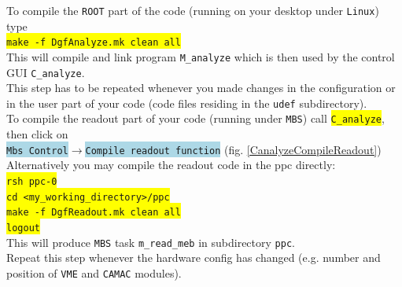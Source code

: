 \documentclass[10pt]{article}
\newcommand{\blue}[1]{\colorbox{lightblue}{\texttt{#1}}}
\newcommand{\yellow}[1]{\colorbox{yellow}{\texttt{#1}}}
\begin{document}
To compile the \texttt{ROOT} part of the code (running on your desktop under \texttt{Linux}) type\\

\hspace*{.2\linewidth}\yellow{make -f DgfAnalyze.mk clean all}\\

This will compile and link program \texttt{M\_analyze} which is then used by the control GUI \texttt{C\_analyze}.\\
This step has to be repeated whenever you made changes in the configuration or in the user part of your code (code files residing
in the \texttt{udef} subdirectory).\\

To compile the readout part of your code (running under \texttt{MBS}) call \yellow{C\_analyze}, then click on\\

\hspace*{.2\linewidth}\blue{Mbs Control}$\rightarrow$\blue{Compile readout function} (fig. \ref{CanalyzeCompileReadout})\\

Alternatively you may compile the readout code in the ppc directly:\\

\hspace*{.2\linewidth}\yellow{rsh ppc-0}\\
\hspace*{.2\linewidth}\yellow{cd <my\_working\_directory>/ppc}\\
\hspace*{.2\linewidth}\yellow{make -f DgfReadout.mk clean all}\\
\hspace*{.2\linewidth}\yellow{logout}\\

This will produce \texttt{MBS} task \texttt{m\_read\_meb} in subdirectory \texttt{ppc}.\\
Repeat this step whenever the hardware config has changed (e.g. number and position of \texttt{VME} and \texttt{CAMAC} modules). 
\end{document}
